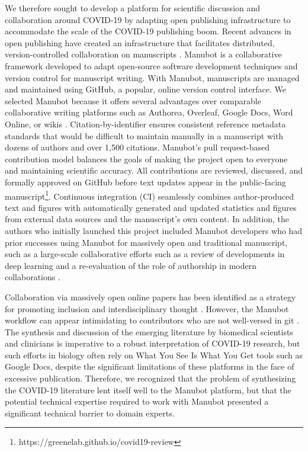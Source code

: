 \documentclass[twocolumn]{ceurart}
\begin{document}
We therefore sought to develop a platform for scientific discussion and collaboration around COVID-19 by adapting open publishing infrastructure to accommodate the scale of the COVID-19 publishing boom.
Recent advances in open publishing have created an infrastructure that facilitates distributed, version-controlled collaboration on manuscripts \citep{YuJbg3zO}.
Manubot \citep{YuJbg3zO} is a collaborative framework developed to adapt open-source software development techniques and version control for manuscript writing.
With Manubot, manuscripts are managed and maintained using GitHub, a popular, online version control interface.
We selected Manubot because it offers several advantages over comparable collaborative writing platforms such as Authorea, Overleaf, Google Docs, Word Online, or wikis \citep{YuJbg3zO}.
Citation-by-identifier ensures consistent reference metadata standards that would be difficult to maintain manually in a manuscript with dozens of authors and over 1,500 citations.
Manubot's pull request-based contribution model balances the goals of making the project open to everyone and maintaining scientific accuracy.
All contributions are reviewed, discussed, and formally approved on GitHub before text updates appear in the public-facing manuscript\footnote{https://greenelab.github.io/covid19-review}.
Continuous integration (CI) seamlessly combines author-produced text and figures with automatically generated and updated statistics and figures from external data sources and the manuscript's own content.
In addition, the authors who initially launched this project included Manubot developers who had prior successes using Manubot for massively open and traditional manuscript, such as a large-scale collaborative efforts such as a review of developments in deep learning \citep{PZMP42Ak} and a re-evaluation of the role of authorship in modern collaborations \citep{6acsZuy7}.

Collaboration via massively open online papers has been identified as a strategy for promoting inclusion and interdisciplinary thought \citep{PoDz2q0A}.
However, the Manubot workflow can appear intimidating to contributors who are not well-versed in git \citep{PoDz2q0A}.
The synthesis and discussion of the emerging literature by biomedical scientists and clinicians is imperative to a robust interpretation of COVID-19 research, but such efforts in biology often rely on What You See Is What You Get tools such as Google Docs, despite the significant limitations of these platforms in the face of excessive publication.
Therefore, we recognized that the problem of synthesizing the COVID-19 literature lent itself well to the Manubot platform, but that the potential technical expertise required to work with Manubot presented a significant technical barrier to domain experts.
\end{document}
